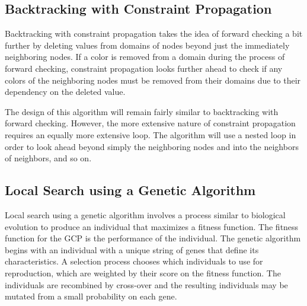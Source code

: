 \documentclass{article}
\begin{document}
\begin{multicols}{2}
\subsection{Backtracking with Constraint Propagation}
Backtracking with constraint propagation takes the idea of forward checking a bit further by deleting values from domains of nodes beyond just the immediately neighboring nodes.  If a color is removed from a domain during the process of forward checking, constraint propagation looks further ahead to check if any colors of the neighboring nodes must be removed from their domains due to their dependency on the deleted value. \par
The design of this algorithm will remain fairly similar to backtracking with forward checking.  However, the more extensive nature of constraint propagation requires an equally more extensive loop.  The algorithm will use a nested loop in order to look ahead beyond simply the neighboring nodes and into the neighbors of neighbors, and so on. \par
\subsection{Local Search using a Genetic Algorithm}
Local search using a genetic algorithm involves a process similar to biological evolution to produce an individual that maximizes a fitness function.  The fitness function for the GCP is the performance of the individual.  The genetic algorithm begins with an individual with a unique string of genes that define its characteristics.  A selection process chooses which individuals to use for reproduction, which are weighted by their score on the fitness function.  The individuals are recombined by cross-over and the resulting individuals may be mutated from a small probability on each gene. \par


\end{multicols}

	
	
\end{document}
